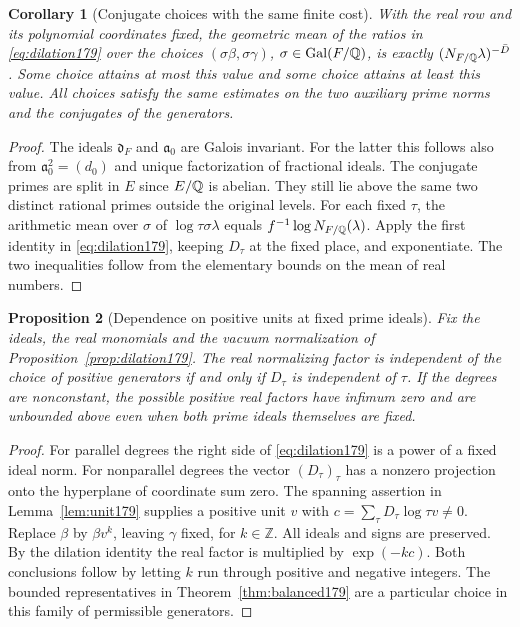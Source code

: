 \documentclass[a4paper,11pt]{article}
\newtheorem{proposition}{Proposition}[section]
\newtheorem{corollary}[proposition]{Corollary}
\theoremstyle{definition}
\theoremstyle{remark}
\newcommand{\ZZ}{\mathbb Z}\newcommand{\ord}{\operatorname{ord}}
\numberwithin{equation}{section}
\begin{document}
\begin{corollary}[Conjugate choices with the same finite cost]
\label{cor:mean179}
With the real row and its polynomial coordinates fixed,
the geometric mean of the ratios in \eqref{eq:dilation179}
over the choices \((\sigma\beta,\sigma\gamma)\), \(\sigma\in
\operatorname{Gal}(F/\mathbb Q)\), is exactly
\((N_{F/\mathbb Q}\lambda)^{-\bar D}\). Some choice attains
at most this value and some choice attains at least this
value. All choices satisfy the same estimates on the two
auxiliary prime norms and the conjugates of the generators.
\end{corollary}
\begin{proof}
The ideals \(\mathfrak d_F\) and \(\mathfrak a_0\) are
Galois invariant. For the latter this follows also from
\(\mathfrak a_0^2=(d_0)\) and unique factorization of
fractional ideals. The conjugate primes are split in \(E\)
since \(E/\mathbb Q\) is abelian. They still lie above the same
two distinct rational primes outside the original levels.
For each fixed \(\tau\), the arithmetic mean over \(\sigma\)
of \(\log \tau\sigma\lambda\) equals
\(f^{-1}\log N_{F/\mathbb Q}(\lambda)\). Apply the first identity
in \eqref{eq:dilation179}, keeping \(D_\tau\) at the fixed
place, and exponentiate. The two inequalities follow from
the elementary bounds on the mean of real numbers.
\end{proof}

\begin{proposition}[Dependence on positive units at fixed prime ideals]
\label{prop:unitfreedom179}
Fix the ideals, the real monomials and the vacuum normalization
of Proposition~\ref{prop:dilation179}. The real normalizing
factor is independent of the choice of positive generators
if and only if \(D_\tau\) is independent of \(\tau\). If the
degrees are nonconstant, the possible positive real factors
have infimum zero and are unbounded above even when both
prime ideals themselves are fixed.
\end{proposition}
\begin{proof}
For parallel degrees the right side of \eqref{eq:dilation179}
is a power of a fixed ideal norm. For nonparallel degrees the
vector \((D_\tau)_\tau\) has a nonzero projection onto the
hyperplane of coordinate sum zero. The spanning assertion in
Lemma~\ref{lem:unit179} supplies a positive unit \(v\) with
\(c=\sum_\tau D_\tau\log\tau v\ne0\). Replace \(\beta\) by
\(\beta v^k\), leaving \(\gamma\) fixed, for \(k\in\ZZ\).
All ideals and signs are preserved. By the dilation identity
the real factor is multiplied by \(\exp(-kc)\). Both conclusions
follow by letting \(k\) run through positive and negative
integers. The bounded representatives in
Theorem~\ref{thm:balanced179} are a particular choice in this
family of permissible generators.
\end{proof}
\end{document}
